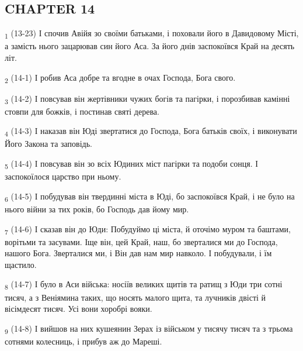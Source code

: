 \subsection{CHAPTER 14}
\begin{tcolorbox}
\textsubscript{1} (13-23) І спочив Авійя зо своїми батьками, і поховали його в Давидовому Місті, а замість нього зацарював син його Аса. За його днів заспокоївся Край на десять літ.
\end{tcolorbox}
\begin{tcolorbox}
\textsubscript{2} (14-1) І робив Аса добре та вгодне в очах Господа, Бога свого.
\end{tcolorbox}
\begin{tcolorbox}
\textsubscript{3} (14-2) І повсував він жертівники чужих богів та пагірки, і порозбивав камінні стовпи для божків, і постинав святі дерева.
\end{tcolorbox}
\begin{tcolorbox}
\textsubscript{4} (14-3) І наказав він Юді звертатися до Господа, Бога батьків своїх, і виконувати Його Закона та заповідь.
\end{tcolorbox}
\begin{tcolorbox}
\textsubscript{5} (14-4) І повсував він зо всіх Юдиних міст пагірки та подоби сонця. І заспокоїлося царство при ньому.
\end{tcolorbox}
\begin{tcolorbox}
\textsubscript{6} (14-5) І побудував він твердинні міста в Юді, бо заспокоївся Край, і не було на нього війни за тих років, бо Господь дав йому мир.
\end{tcolorbox}
\begin{tcolorbox}
\textsubscript{7} (14-6) І сказав він до Юди: Побудуймо ці міста, й оточімо муром та баштами, ворітьми та засувами. Іще він, цей Край, наш, бо зверталися ми до Господа, нашого Бога. Зверталися ми, і Він дав нам мир навколо. І побудували, і їм щастило.
\end{tcolorbox}
\begin{tcolorbox}
\textsubscript{8} (14-7) І було в Аси війська: носіїв великих щитів та ратищ з Юди три сотні тисяч, а з Веніямина таких, що носять малого щита, та лучників двісті й вісімдесят тисяч. Усі вони хоробрі вояки.
\end{tcolorbox}
\begin{tcolorbox}
\textsubscript{9} (14-8) І вийшов на них кушеянин Зерах із військом у тисячу тисяч та з трьома сотнями колесниць, і прибув аж до Мареші.
\end{tcolorbox}
